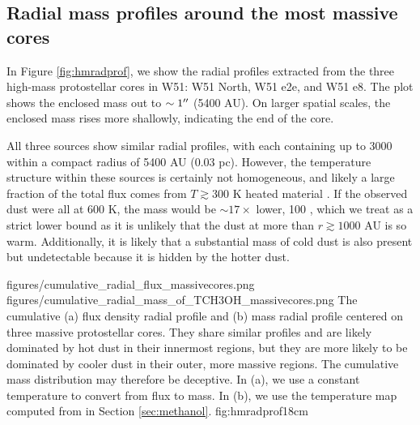 \documentclass{emulateapj}
\begin{document}
\subsection{Radial mass profiles around the most massive cores}
\label{sec:radialmass}
In Figure \ref{fig:hmradprof}, we show the radial profiles extracted from the
three high-mass protostellar cores in W51: W51 North, W51 e2e, and W51 e8.
The plot shows the enclosed mass out to $\sim1\mbox{$^{\prime\prime}$}$ (5400 AU).  On larger
spatial scales, the enclosed mass rises more shallowly, indicating the end of the
core.

All three sources show similar radial profiles, with each containing up to 3000
\msun within a compact radius of 5400 AU (0.03 pc).  However, the temperature
structure within these sources is certainly not homogeneous, and  likely a
large fraction of the total flux comes from $T\gtrsim300$ K heated material
\citep[Section \ref{sec:temperature}; ][]{Goddi2016a}.  If the observed dust
were all at 600 K, the mass would be $\sim17\times$ lower, 100 \msun, which we
treat as a strict lower bound as it is unlikely that the dust at more than
$r\gtrsim1000$ AU is so warm.  Additionally, it is  likely that a substantial
mass of cold dust is also present but undetectable because it is hidden by the
hotter dust.

\FigureTwo
{figures/cumulative_radial_flux_massivecores.png}
{figures/cumulative_radial_mass_of_TCH3OH_massivecores.png}
{The cumulative (a) flux density radial profile and (b) mass radial profile
centered on three massive protostellar cores.  They share similar profiles and
are likely dominated by hot dust in their innermost regions, but they are more
likely to be dominated by cooler dust in their outer, more massive regions.
The cumulative mass distribution may therefore be deceptive.  In (a), we use a
constant temperature to convert from flux to mass.  In (b), we use the
temperature map computed from \methanol in
Section \ref{sec:methanol}.}
{fig:hmradprof}{1}{8cm}


\end{document}
